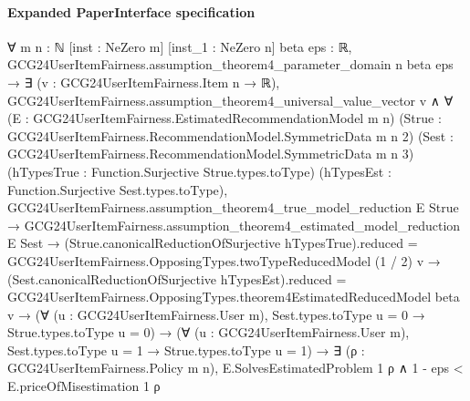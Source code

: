 \documentclass[10pt]{article}
\begin{document}
\paragraph{Expanded PaperInterface specification}
\begin{ReviewVerbatim}
∀ {m n : ℕ} [inst : NeZero m] [inst_1 : NeZero n] {beta eps : ℝ},
  GCG24UserItemFairness.assumption_theorem4_parameter_domain n beta eps →
    ∃ (v : GCG24UserItemFairness.Item n → ℝ),
      GCG24UserItemFairness.assumption_theorem4_universal_value_vector v ∧
        ∀ (E : GCG24UserItemFairness.EstimatedRecommendationModel m n)
          (Strue : GCG24UserItemFairness.RecommendationModel.SymmetricData m n 2)
          (Sest : GCG24UserItemFairness.RecommendationModel.SymmetricData m n 3)
          (hTypesTrue : Function.Surjective Strue.types.toType) (hTypesEst : Function.Surjective Sest.types.toType),
          GCG24UserItemFairness.assumption_theorem4_true_model_reduction E Strue →
            GCG24UserItemFairness.assumption_theorem4_estimated_model_reduction E Sest →
              (Strue.canonicalReductionOfSurjective hTypesTrue).reduced =
                  GCG24UserItemFairness.OpposingTypes.twoTypeReducedModel (1 / 2) v →
                (Sest.canonicalReductionOfSurjective hTypesEst).reduced =
                    GCG24UserItemFairness.OpposingTypes.theorem4EstimatedReducedModel beta v →
                  (∀ (u : GCG24UserItemFairness.User m), Sest.types.toType u = 0 → Strue.types.toType u = 0) →
                    (∀ (u : GCG24UserItemFairness.User m), Sest.types.toType u = 1 → Strue.types.toType u = 1) →
                      ∃ (ρ : GCG24UserItemFairness.Policy m n),
                        E.SolvesEstimatedProblem 1 ρ ∧ 1 - eps < E.priceOfMisestimation 1 ρ
\end{ReviewVerbatim}
\end{document}
